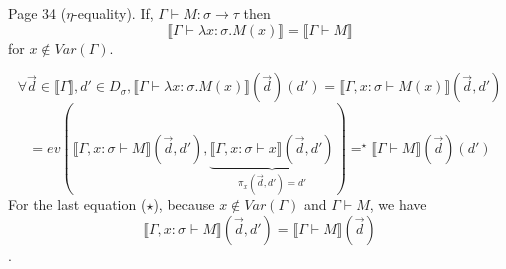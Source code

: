 \begin{problem}{Page 34}
    ($\eta$-equality). If, $\Gamma \vdash M:\sigma \to \tau$ then
$$ \llbracket \Gamma \vdash \lambda x:\sigma . M(x) \rrbracket = \llbracket \Gamma \vdash M \rrbracket $$
for $x \notin Var(\Gamma)$.
\end{problem}

\begin{solution}
    $$ \forall \vec{d} \in \llbracket \Gamma \rrbracket, d' \in D_\sigma, \llbracket \Gamma \vdash \lambda x : \sigma . M(x) \rrbracket (\vec{d})(d') = \llbracket \Gamma , x:\sigma \vdash M(x) \rrbracket (\vec{d}, d') $$
$$ = ev(\llbracket \Gamma , x:\sigma \vdash M \rrbracket (\vec{d}, d'), \underbrace{\llbracket \Gamma , x:\sigma \vdash x \rrbracket(\vec{d}, d')}_{\pi_x(\vec{d}, d') = d'}) =^\star \llbracket \Gamma \vdash M \rrbracket (\vec{d})(d')$$
For the last equation ($\star$), because $x \notin Var(\Gamma)$ and $\Gamma \vdash M$, we have $$\llbracket \Gamma , x:\sigma \vdash M \rrbracket (\vec{d},d') = \llbracket \Gamma \vdash M \rrbracket (\vec{d})$$.
\end{solution}